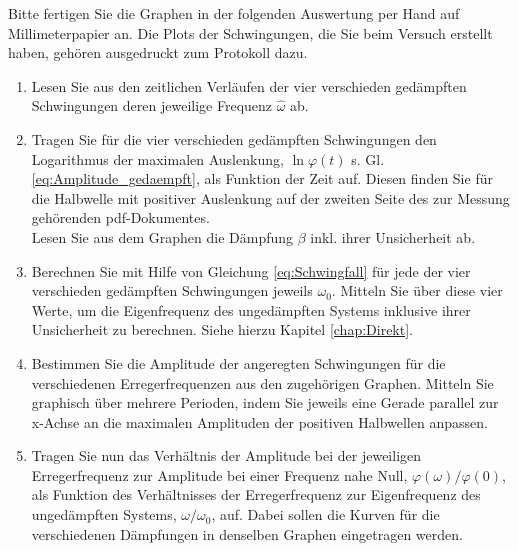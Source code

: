 \begin{hint}
	Bitte fertigen Sie die Graphen in der folgenden Auswertung per Hand auf Millimeterpapier an. Die Plots der Schwingungen, die Sie beim Versuch erstellt haben, gehören ausgedruckt zum Protokoll dazu.
\end{hint}

\begin{enumerate}
	\item \label{aw:Schwingfall} Lesen Sie aus den zeitlichen Verläufen der vier verschieden gedämpften Schwingungen deren jeweilige Frequenz $\hat{\omega}$ ab.
	\item \label{aw:Log_Dekrement}Tragen Sie für die vier verschieden gedämpften Schwingungen den Logarithmus der maximalen Auslenkung, $\ln\varphi(t)$ s. Gl. \ref{eq:Amplitude_gedaempft}, als Funktion der Zeit auf. Diesen finden Sie für die Halbwelle mit positiver Auslenkung auf der zweiten Seite des zur Messung gehörenden pdf-Dokumentes. \\
	Lesen Sie aus dem Graphen die Dämpfung $\beta$ inkl. ihrer Unsicherheit ab.
	\item Berechnen Sie mit Hilfe von Gleichung \ref{eq:Schwingfall} für jede der vier verschieden gedämpften Schwingungen jeweils $\omega_0$. Mitteln Sie über diese vier Werte, um die Eigenfrequenz des ungedämpften Systems inklusive ihrer Unsicherheit zu berechnen. Siehe hierzu Kapitel \ref{chap:Direkt}.
	\item Bestimmen Sie die Amplitude der angeregten Schwingungen für die verschiedenen Erregerfrequenzen aus den zugehörigen Graphen. Mitteln Sie graphisch über mehrere Perioden, indem Sie jeweils eine Gerade parallel zur x-Achse  an die maximalen Amplituden der positiven Halbwellen anpassen. 
	\item Tragen Sie nun das Verhältnis der Amplitude bei der jeweiligen Erregerfrequenz zur Amplitude bei einer Frequenz nahe Null, $\varphi(\omega)/\varphi(0)$, als Funktion des Verhältnisses der Erregerfrequenz zur Eigenfrequenz des ungedämpften Systems, $\omega/\omega_0$, auf. Dabei sollen die Kurven für die verschiedenen Dämpfungen in denselben Graphen eingetragen werden.
\end{enumerate}